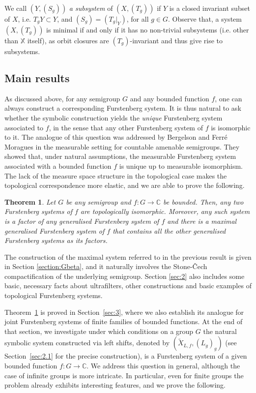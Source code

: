 \documentclass{amsart}
\numberwithin{equation}{section}
\newtheorem{theorem}[lemma]{Theorem}
\theoremstyle{definition}
\theoremstyle{plain}
\newcommand{\C}{{\mathbb C}}
\begin{document}
We call $(Y,(S_g))$ \textit{a subsystem} of $(X,(T_g))$ if 
$Y$ is a closed invariant subset of $X$, i.e. $T_gY\subset Y$, and $(S_g)=(T_g|_{Y})$, for all $g\in G$. Observe that, a system $(X,(T_g))$ is minimal if and only if it has no non-trivial subsystems (i.e. other than $\mathbb{X}$ itself), as orbit closures are $(T_g)$-invariant and thus give rise to subsystems. 
\subsection{Main results}


\noindent As discussed above, for any semigroup $G$  and any bounded function $f$, one can always construct a corresponding Furstenberg system. It is thus natural to ask whether the symbolic construction yields the \emph{unique} Furstenberg system associated to $f$, in the sense that any other Furstenberg system of $f$ is isomorphic to it. The analogue of this question was addressed by Bergelson and Ferr\'e Moragues \cite{Bergelson_Moragues} in the measurable setting for countable amenable semigroups. They showed that, under natural assumptions, the measurable Furstenberg system associated with a bounded function $f$ is unique up to measurable isomorphism. The lack of the measure space structure in the topological case makes the topological
correspondence more elastic, and we are able to prove the 
following. 

\begin{theorem}\label{FS are isomorphic intro}
Let $G$ be any semigroup and $f:G\to \C$ be bounded. Then, 
any two Furstenberg systems of $f$ are topologically 
isomorphic. 
Moreover, any such system is a factor 
of any generalised Furstenberg 
system of $f$ and there is a maximal generalised 
Furstenberg system of $f$ that contains all the 
other generalised Furstenberg systems as its factors.
\end{theorem}

The construction of the maximal system referred to in the 
previous result is given in Section
\ref{section:Gbeta}, and it naturally involves the Stone-Čech 
compactification of the underlying semigroup. Section 
\ref{sec:2} also includes some basic, necessary facts about 
ultrafilters, other constructions and basic examples of topological 
Furstenberg systems.

Theorem~\ref{FS are isomorphic intro} is proved in Section~\ref{sec:3}, 
where we also establish its analogue for joint Furstenberg systems of 
finite families of bounded functions. At the end of that section, we 
investigate under which conditions on a group $G$ the natural symbolic 
system constructed via left shifts, denoted by 
$(\widetilde{X}_{L,f}, (L_g)_g)$ (see Section~\ref{sec:2.1} for the precise 
construction), is a Furstenberg system of a given bounded function 
$f: G \to \mathbb{C}$. We address this question in general, although the case of infinite groups is more intricate. In particular, even for finite groups the problem already exhibits interesting features, and we prove the following.
\end{document}
